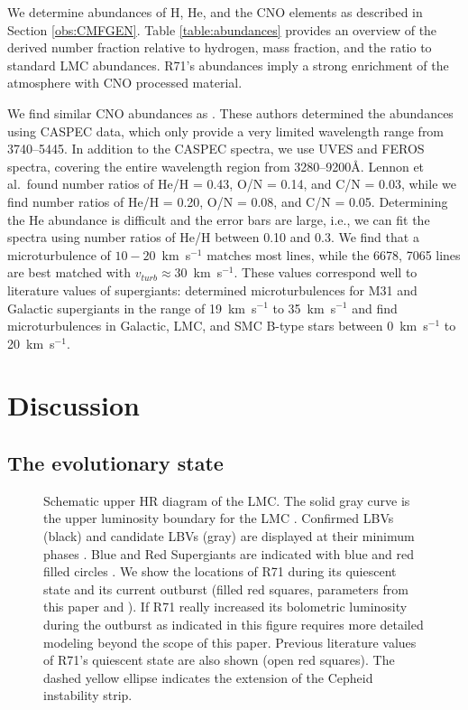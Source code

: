 \documentclass[structabstract]{aa}
\begin{document}
We determine abundances of H, He, and the CNO elements as described in Section \ref{obs:CMFGEN}. Table \ref{table:abundances} provides an overview of the derived number fraction relative to hydrogen, mass fraction, and the ratio to standard LMC abundances. R71's abundances imply a strong enrichment of the atmosphere with CNO processed material.

We find similar CNO abundances as \citet{1993SSRv...66..207L}. These authors determined the abundances using CASPEC data, which only provide a very limited wavelength range from 3740--5445. In addition to the CASPEC spectra, we use UVES and FEROS spectra, covering the entire wavelength region from 3280--9200\AA. Lennon et al.\ found number ratios of He/H = 0.43, O/N = 0.14, and C/N = 0.03, while we find number ratios of He/H = 0.20, O/N = 0.08, and C/N = 0.05. Determining the He abundance is difficult and the error bars are large, i.e., we can fit the spectra using number ratios of He/H between 0.10 and 0.3. We find that a microturbulence of $10-20$~km~s$^{-1}$ matches most lines, while the  6678, 7065 lines are best matched with $v_{turb} \approx 30$~km~s$^{-1}$. These values correspond well to literature values of supergiants: \citet{2002A&A...395..519T} determined  microturbulences for M31 and Galactic supergiants in the range of 19~km~s$^{-1}$ to 35~km~s$^{-1}$ and \citet{2007A&A...471..625T} find microturbulences in Galactic, LMC, and SMC B-type stars between 0~km~s$^{-1}$ to 20~km~s$^{-1}$.



\section{Discussion}
\label{discussion}

\subsection{The evolutionary state}
\label{discussion:classification}

\begin{figure*}
\centering
{}
     \caption{Schematic upper HR diagram of the LMC. The solid gray curve is the upper luminosity boundary for the LMC \citep{1979ApJ...232..409H}. Confirmed LBVs (black) and candidate LBVs (gray) are displayed at their minimum phases \citep{1986A&A...163..119Z,1996A&A...315..510Z,2001A&A...366..508V,2002A&A...389..931T,2004ApJ...610.1021E,2014A&A...565A..27H}. Blue and Red Supergiants are indicated with blue and red filled circles \citep{2004A&A...417..217T,2005A&A...434..677T,2006ApJ...645.1102L,2008A&A...479..541H}.
We show the locations of R71 during its quiescent state and its current outburst (filled red squares, parameters from this paper and \citealt{2013A&A...555A.116M}). If R71 really increased its bolometric luminosity during the outburst as indicated in this figure requires more detailed modeling beyond the scope of this paper. Previous literature values of R71's quiescent state are also shown (open red squares). The dashed yellow ellipse indicates the extension of the Cepheid instability strip.} \label{figure:HRdiagram}
\end{figure*}
\end{document}
